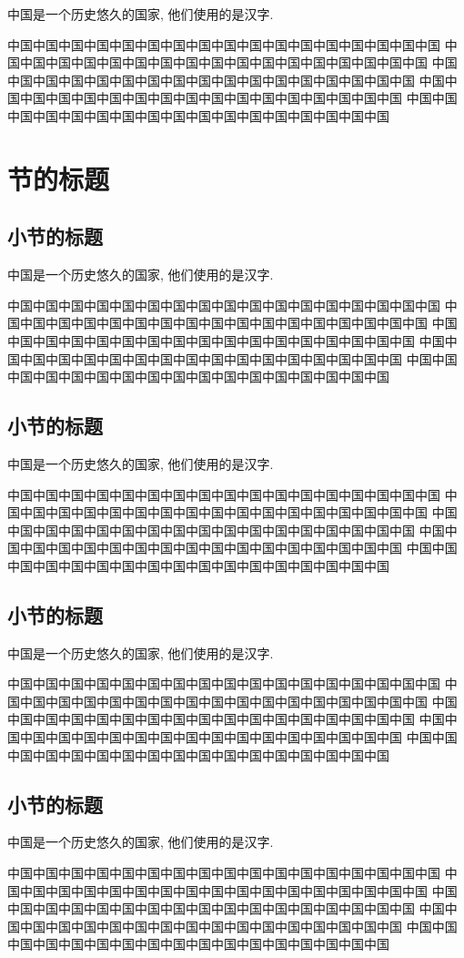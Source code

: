 中国是一个历史悠久的国家, 他们使用的是汉字.

中国中国中国中国中国中国中国中国中国中国中国中国中国中国中国中国中国
中国中国中国中国中国中国中国中国中国中国中国中国中国中国中国中国中国
中国中国中国中国中国中国中国中国中国中国中国中国中国中国中国中国中国
中国中国中国中国中国中国中国中国中国中国中国中国中国中国中国中国中国
中国中国中国中国中国中国中国中国中国中国中国中国中国中国中国中国中国

\section{节的标题}

\subsection{小节的标题}

中国是一个历史悠久的国家, 他们使用的是汉字.

中国中国中国中国中国中国中国中国中国中国中国中国中国中国中国中国中国
中国中国中国中国中国中国中国中国中国中国中国中国中国中国中国中国中国
中国中国中国中国中国中国中国中国中国中国中国中国中国中国中国中国中国
中国中国中国中国中国中国中国中国中国中国中国中国中国中国中国中国中国
中国中国中国中国中国中国中国中国中国中国中国中国中国中国中国中国中国

\subsection{小节的标题}

中国是一个历史悠久的国家, 他们使用的是汉字.

中国中国中国中国中国中国中国中国中国中国中国中国中国中国中国中国中国
中国中国中国中国中国中国中国中国中国中国中国中国中国中国中国中国中国
中国中国中国中国中国中国中国中国中国中国中国中国中国中国中国中国中国
中国中国中国中国中国中国中国中国中国中国中国中国中国中国中国中国中国
中国中国中国中国中国中国中国中国中国中国中国中国中国中国中国中国中国

\subsection{小节的标题}

中国是一个历史悠久的国家, 他们使用的是汉字.

中国中国中国中国中国中国中国中国中国中国中国中国中国中国中国中国中国
中国中国中国中国中国中国中国中国中国中国中国中国中国中国中国中国中国
中国中国中国中国中国中国中国中国中国中国中国中国中国中国中国中国中国
中国中国中国中国中国中国中国中国中国中国中国中国中国中国中国中国中国
中国中国中国中国中国中国中国中国中国中国中国中国中国中国中国中国中国

\subsection{小节的标题}

中国是一个历史悠久的国家, 他们使用的是汉字.

中国中国中国中国中国中国中国中国中国中国中国中国中国中国中国中国中国
中国中国中国中国中国中国中国中国中国中国中国中国中国中国中国中国中国
中国中国中国中国中国中国中国中国中国中国中国中国中国中国中国中国中国
中国中国中国中国中国中国中国中国中国中国中国中国中国中国中国中国中国
中国中国中国中国中国中国中国中国中国中国中国中国中国中国中国中国中国